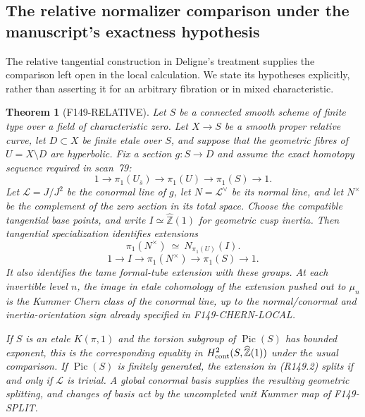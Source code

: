 \documentclass[11pt,a4paper]{article}
\newtheorem{theorem}{Theorem}[section]
\theoremstyle{definition}
\begin{document}
\subsection{The relative normalizer comparison under the manuscript's exactness hypothesis}

The relative tangential construction in Deligne's treatment supplies
the comparison left open in the local calculation. We state its
hypotheses explicitly, rather than asserting it for an arbitrary
fibration or in mixed characteristic.

\begin{theorem}[F149-RELATIVE]\label{thm:archive-relative}
Let $S$ be a connected smooth scheme of finite type over a field of
characteristic zero. Let $X\to S$ be a smooth proper relative curve,
let $D\subset X$ be finite etale over $S$, and suppose that the
geometric fibres of $U=X\setminus D$ are hyperbolic. Fix a section
$g:S\to D$ and assume the exact homotopy sequence required in scan~79:
\[
 1\longrightarrow\pi_1(U_{\bar s})
 \longrightarrow\pi_1(U)\longrightarrow\pi_1(S)\longrightarrow1.
                                                               \tag{R149.1}
\]
Let $\mathcal L=J/J^2$ be the conormal line of $g$, let
$N=\mathcal L^\vee$ be its normal line, and let $N^\times$
be the complement of the zero section in its total space.
Choose the compatible tangential base points, and write
$I\simeq\widehat{\mathbb Z}(1)$ for geometric cusp inertia.
Then tangential specialization identifies extensions
\[
 \pi_1(N^\times)\ \simeq\ N_{\pi_1(U)}(I).
\]
\[
 1\longrightarrow I\longrightarrow\pi_1(N^\times)
 \longrightarrow\pi_1(S)\longrightarrow1.                       \tag{R149.2}
\]
It also identifies the tame formal-tube extension with these groups.
At each invertible level $n$, the image in etale cohomology of the
extension pushed out to $\mu_n$ is the Kummer Chern class of the
conormal line, up to the normal/conormal and inertia-orientation sign
already specified in F149-CHERN-LOCAL.

If $S$ is an etale $K(\pi,1)$ and the torsion subgroup of
$\operatorname{Pic}(S)$ has bounded exponent, this is the corresponding equality in
$H^2_{\rm cont}(S,\widehat{\mathbb Z}(1))$ under the usual comparison.
If $\operatorname{Pic}(S)$ is finitely generated, the extension in
(R149.2) splits if and only if $\mathcal L$ is trivial. A global
conormal basis supplies the resulting geometric splitting, and changes
of basis act by the uncompleted unit Kummer map of F149-SPLIT.
\end{theorem}
\end{document}
